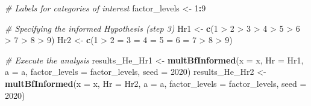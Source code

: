 \documentclass[
  english,
  man,floatsintext]{apa6}
\newenvironment{Shaded}{\begin{snugshade}}{\end{snugshade}}
\newcommand{\CommentTok}[1]{\textcolor[rgb]{0.56,0.35,0.01}{\textit{#1}}}
\newcommand{\DataTypeTok}[1]{\textcolor[rgb]{0.13,0.29,0.53}{#1}}
\newcommand{\DecValTok}[1]{\textcolor[rgb]{0.00,0.00,0.81}{#1}}
\newcommand{\KeywordTok}[1]{\textcolor[rgb]{0.13,0.29,0.53}{\textbf{#1}}}
\newcommand{\NormalTok}[1]{#1}
\newcommand{\OperatorTok}[1]{\textcolor[rgb]{0.81,0.36,0.00}{\textbf{#1}}}
\newcommand{\StringTok}[1]{\textcolor[rgb]{0.31,0.60,0.02}{#1}}
\begin{document}
\begin{Shaded}
\begin{Highlighting}[]
\CommentTok{\# Labels for categories of interest}
\NormalTok{factor\_levels \textless{}{-}}\StringTok{ }\DecValTok{1}\OperatorTok{:}\DecValTok{9}

\CommentTok{\# Specifying the informed Hypothesis (step 3)}
\NormalTok{Hr1 \textless{}{-}}\StringTok{ }\KeywordTok{c}\NormalTok{(}\StringTok{\textquotesingle{}1 \textgreater{} 2 \textgreater{} 3 \textgreater{} 4 \textgreater{} 5 \textgreater{} 6 \textgreater{} 7 \textgreater{} 8 \textgreater{} 9\textquotesingle{}}\NormalTok{)}
\NormalTok{Hr2 \textless{}{-}}\StringTok{ }\KeywordTok{c}\NormalTok{(}\StringTok{\textquotesingle{}1 \textgreater{} 2 = 3 = 4 = 5 = 6 = 7 \textgreater{} 8 \textgreater{} 9\textquotesingle{}}\NormalTok{)}

\CommentTok{\# Execute the analysis}
\NormalTok{results\_He\_Hr1 \textless{}{-}}\StringTok{ }\KeywordTok{multBfInformed}\NormalTok{(}\DataTypeTok{x =}\NormalTok{ x, }\DataTypeTok{Hr =}\NormalTok{ Hr1, }\DataTypeTok{a =}\NormalTok{ a, }
                                 \DataTypeTok{factor\_levels =}\NormalTok{ factor\_levels, }
                                 \DataTypeTok{seed =} \DecValTok{2020}\NormalTok{)}
\NormalTok{results\_He\_Hr2 \textless{}{-}}\StringTok{ }\KeywordTok{multBfInformed}\NormalTok{(}\DataTypeTok{x =}\NormalTok{ x, }\DataTypeTok{Hr =}\NormalTok{ Hr2, }\DataTypeTok{a =}\NormalTok{ a, }
                                 \DataTypeTok{factor\_levels =}\NormalTok{ factor\_levels, }
                                 \DataTypeTok{seed =} \DecValTok{2020}\NormalTok{)}
\end{Highlighting}
\end{Shaded}

\begin{Shaded}
\end{Shaded}
\end{document}
